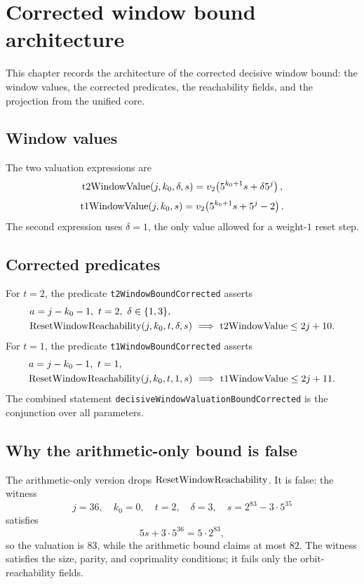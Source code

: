 \section{Corrected window bound architecture}

This chapter records the architecture of the corrected decisive
window bound: the window values, the corrected predicates, the
reachability fields, and the projection from the unified core.

\subsection{Window values}

The two valuation expressions are
\begin{equation*}
  \mathrm{t2WindowValue}(j,k_0,\delta,s)
    =v_2\!\left(5^{k_0+1}s+\delta5^j\right),
\end{equation*}
\begin{equation*}
  \mathrm{t1WindowValue}(j,k_0,s)
    =v_2\!\left(5^{k_0+1}s+5^j-2\right).
\end{equation*}
The second expression uses $\delta=1$, the only value allowed for a
weight-$1$ reset step.

\subsection{Corrected predicates}

For $t=2$, the predicate \texttt{t2WindowBoundCorrected} asserts
\begin{align*}
  &a=j-k_0-1,\ t=2,\ \delta\in\{1,3\},\\
  &\mathrm{ResetWindowReachability}(j,k_0,t,\delta,s)
    \ \Longrightarrow\ \mathrm{t2WindowValue}\le2j+10.
\end{align*}
For $t=1$, the predicate \texttt{t1WindowBoundCorrected} asserts
\begin{align*}
  &a=j-k_0-1,\ t=1,\\
  &\mathrm{ResetWindowReachability}(j,k_0,t,1,s)
    \ \Longrightarrow\ \mathrm{t1WindowValue}\le2j+11.
\end{align*}
The combined statement
\texttt{decisiveWindowValuationBoundCorrected} is the conjunction over
all parameters.

\subsection{Why the arithmetic-only bound is false}

The arithmetic-only version drops $\mathrm{ResetWindowReachability}$.  It is false: the
witness
\begin{equation*}
  j=36,\quad k_0=0,\quad t=2,\quad \delta=3,\quad
  s=2^{83}-3\cdot5^{35}
\end{equation*}
satisfies
\begin{equation*}
  5s+3\cdot5^{36}=5\cdot2^{83},
\end{equation*}
so the valuation is $83$, while the arithmetic bound claims at most
$82$.  The witness satisfies the size, parity, and coprimality
conditions; it fails only the orbit-reachability fields.

